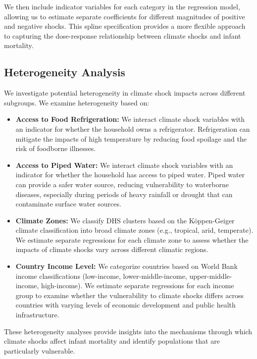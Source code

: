 \documentclass[12pt]{article}
\begin{document}
We then include indicator variables for each category in the regression model, allowing us to estimate separate coefficients for different magnitudes of positive and negative shocks.  This spline specification provides a more flexible approach to capturing the dose-response relationship between climate shocks and infant mortality.

\subsection{Heterogeneity Analysis}

We investigate potential heterogeneity in climate shock impacts across different subgroups.  We examine heterogeneity based on:

\begin{itemize}
    \item \textbf{Access to Food Refrigeration:}  We interact climate shock variables with an indicator for whether the household owns a refrigerator.  Refrigeration can mitigate the impacts of high temperature by reducing food spoilage and the risk of foodborne illnesses.
    \item \textbf{Access to Piped Water:}  We interact climate shock variables with an indicator for whether the household has access to piped water. Piped water can provide a safer water source, reducing vulnerability to waterborne diseases, especially during periods of heavy rainfall or drought that can contaminate surface water sources.
    \item \textbf{Climate Zones:} We classify DHS clusters based on the Köppen-Geiger climate classification \cite{kottek2006, rubel2010} into broad climate zones (e.g., tropical, arid, temperate).  We estimate separate regressions for each climate zone to assess whether the impacts of climate shocks vary across different climatic regions.
    \item \textbf{Country Income Level:} We categorize countries based on World Bank income classifications (low-income, lower-middle-income, upper-middle-income, high-income). We estimate separate regressions for each income group to examine whether the vulnerability to climate shocks differs across countries with varying levels of economic development and public health infrastructure.
\end{itemize}

These heterogeneity analyses provide insights into the mechanisms through which climate shocks affect infant mortality and identify populations that are particularly vulnerable.
\end{document}
